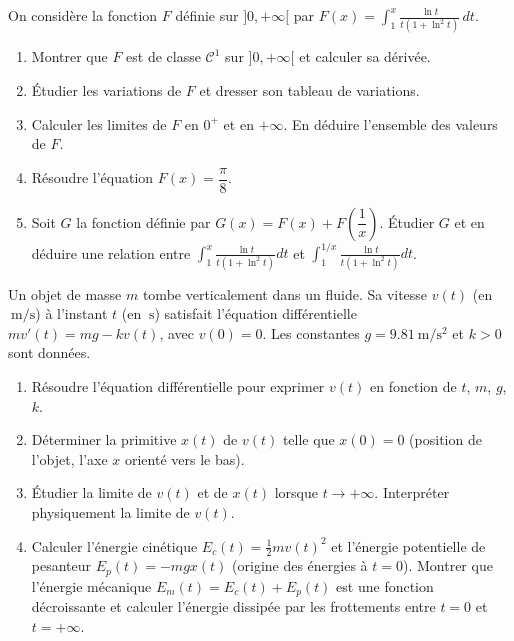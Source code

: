 \documentclass[11pt]{article}
\begin{document}
\begin{exercice}
On considère la fonction $F$ définie sur $]0, +\infty[$ par $F(x) = \displaystyle\int_1^x \frac{\ln t}{t(1+\ln^2 t)} \, dt$.
\begin{enumerate}
    \item Montrer que $F$ est de classe $\mathcal{C}^1$ sur $]0, +\infty[$ et calculer sa dérivée.
    \item Étudier les variations de $F$ et dresser son tableau de variations.
    \item Calculer les limites de $F$ en $0^+$ et en $+\infty$. En déduire l'ensemble des valeurs de $F$.
    \item Résoudre l'équation $F(x) = \dfrac{\pi}{8}$.
    \item Soit $G$ la fonction définie par $G(x) = F(x) + F\left(\dfrac{1}{x}\right)$. Étudier $G$ et en déduire une relation entre $\displaystyle\int_1^x \frac{\ln t}{t(1+\ln^2 t)} dt$ et $\displaystyle\int_1^{1/x} \frac{\ln t}{t(1+\ln^2 t)} dt$.
\end{enumerate}
\end{exercice}

\begin{exercice}
Un objet de masse $m$ tombe verticalement dans un fluide. Sa vitesse $v(t)$ (en $\SI{}{\meter\per\second}$) à l'instant $t$ (en $\SI{}{\second}$) satisfait l'équation différentielle $m v'(t) = mg - k v(t)$, avec $v(0) = 0$. Les constantes $g = \SI{9.81}{\meter\per\second\squared}$ et $k > 0$ sont données.
\begin{enumerate}
    \item Résoudre l'équation différentielle pour exprimer $v(t)$ en fonction de $t$, $m$, $g$, $k$.
    \item Déterminer la primitive $x(t)$ de $v(t)$ telle que $x(0) = 0$ (position de l'objet, l'axe $x$ orienté vers le bas).
    \item Étudier la limite de $v(t)$ et de $x(t)$ lorsque $t \to +\infty$. Interpréter physiquement la limite de $v(t)$.
    \item Calculer l'énergie cinétique $E_c(t) = \frac{1}{2} m v(t)^2$ et l'énergie potentielle de pesanteur $E_p(t) = -mg x(t)$ (origine des énergies à $t=0$). Montrer que l'énergie mécanique $E_m(t) = E_c(t) + E_p(t)$ est une fonction décroissante et calculer l'énergie dissipée par les frottements entre $t=0$ et $t=+\infty$.
\end{enumerate}
\end{exercice}
\end{document}
